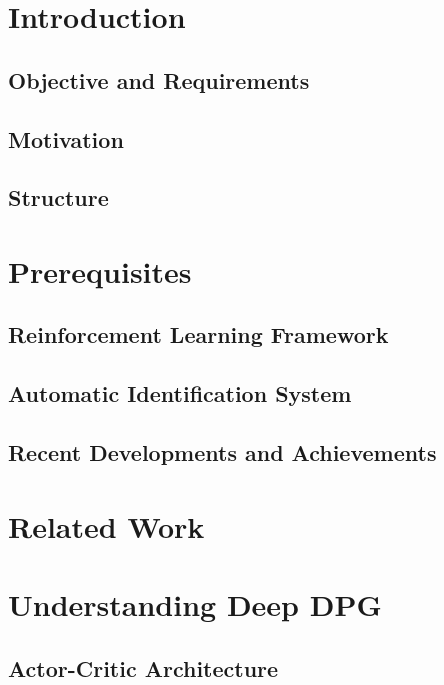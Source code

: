 \section{Introduction}
 \label{chap:intro}
    \subsection{Objective and Requirements}
    
    \subsection{Motivation}
    
    \subsection{Structure}
    
    
\newpage
\section{Prerequisites}\label{chap:prerequisites}
    \subsection{Reinforcement Learning Framework}\label{chap:rlframework}
    
    \subsection{Automatic Identification System}
    
    \subsection{Recent Developments and Achievements}
    
\newpage
\section{Related Work}\label{chap:relatedWork}


\newpage
\section{Understanding Deep DPG}\label{chap:DDPG}

    \subsection{Actor-Critic Architecture}
    
